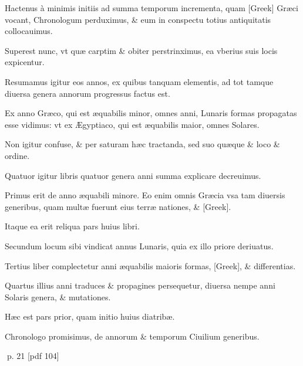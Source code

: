 \begin{parnumbers}
Hactenus à minimis initiis ad summa temporum incrementa, quam \textgreek{[Greek]} Græci vocant, Chronologum perduximus, \& eum in conspectu totius antiquitatis collocauimus.

Superest nunc, vt quæ carptim \& obiter perstrinximus, ea vberius suis locis expicentur.

Resumamus igitur eos annos, ex quibus tanquam elementis, ad tot tamque diuersa genera annorum progressus factus est.

Ex anno Græco, qui est æquabilis minor, omnes anni, Lunaris formas propagatas esse vidimus: vt ex Ægyptiaco, qui est æquabilis maior, omnes Solares.

Non igitur confuse, \& per saturam hæc tractanda, sed suo quæque \& loco \& ordine.

Quatuor igitur libris quatuor genera anni summa explicare decreuimus.

Primus erit de anno æquabili minore. Eo enim omnis Græcia vsa tam diuersis generibus, quam multæ fuerunt eius terræ nationes, \& \textgreek{[Greek]}.

Itaque ea erit reliqua pars huius libri.

Secundum locum sibi vindicat annus  Lunaris, quia ex illo priore deriuatus.

Tertius liber complectetur anni æquabilis maioris formas, \textgreek{[Greek]}, \& differentias.

Quartus illius anni traduces \& propagines persequetur, diuersa nempe anni Solaris genera, \& mutationes.

Hæc est pars prior, quam initio huius diatribæ.

Chronologo promisimus, de annorum \& temporum Ciuilium generibus.

\end{parnumbers}
\clearpage
p. 21 [pdf 104]

